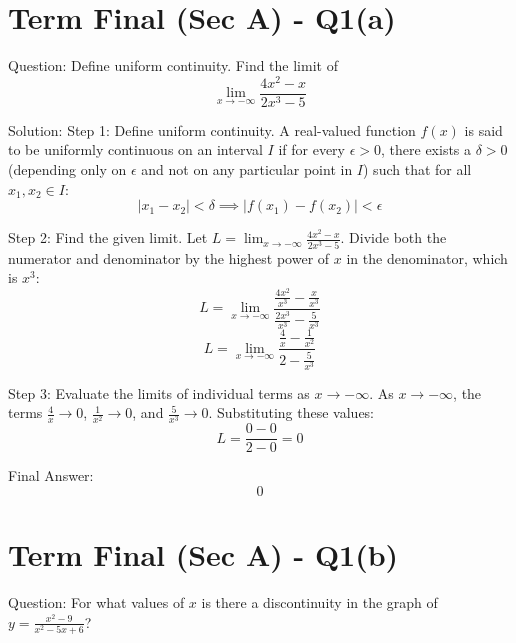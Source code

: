 \documentclass{article}
\begin{document}
\section*{Term Final (Sec A) - Q1(a)}
Question:
Define uniform continuity. Find the limit of
\[
\lim_{x \to -\infty} \frac{4x^2 - x}{2x^3 - 5}
\]

Solution:
Step 1: Define uniform continuity.
A real-valued function $f(x)$ is said to be uniformly continuous on an interval $I$ if for every $\epsilon > 0$, there exists a $\delta > 0$ (depending only on $\epsilon$ and not on any particular point in $I$) such that for all $x_1, x_2 \in I$:
\[
|x_1 - x_2| < \delta \implies |f(x_1) - f(x_2)| < \epsilon
\]

Step 2: Find the given limit.
Let \( L = \lim_{x \to -\infty} \frac{4x^2 - x}{2x^3 - 5} \).
Divide both the numerator and denominator by the highest power of $x$ in the denominator, which is $x^3$:
\[
L = \lim_{x \to -\infty} \frac{\frac{4x^2}{x^3} - \frac{x}{x^3}}{\frac{2x^3}{x^3} - \frac{5}{x^3}}
\]
\[
L = \lim_{x \to -\infty} \frac{\frac{4}{x} - \frac{1}{x^2}}{2 - \frac{5}{x^3}}
\]

Step 3: Evaluate the limits of individual terms as $x \to -\infty$.
As $x \to -\infty$, the terms $\frac{4}{x} \to 0$, $\frac{1}{x^2} \to 0$, and $\frac{5}{x^3} \to 0$.
Substituting these values:
\[
L = \frac{0 - 0}{2 - 0} = 0
\]

Final Answer:
\[
\boxed{0}
\]

\section*{Term Final (Sec A) - Q1(b)}
Question:
For what values of $x$ is there a discontinuity in the graph of $y = \frac{x^2 - 9}{x^2 - 5x + 6}$?
\end{document}
